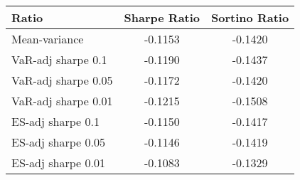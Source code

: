 \begin{tabular}{lcc}
\toprule
Ratio & Sharpe Ratio & Sortino Ratio\\
\midrule
Mean-variance & -0.1153 & -0.1420\\
VaR-adj sharpe 0.1 & -0.1190 & -0.1437\\
VaR-adj sharpe 0.05 & -0.1172 & -0.1420\\
VaR-adj sharpe 0.01 & -0.1215 & -0.1508\\
ES-adj sharpe 0.1 & -0.1150 & -0.1417\\
ES-adj sharpe 0.05 & -0.1146 & -0.1419\\
ES-adj sharpe 0.01 & -0.1083 & -0.1329\\
\bottomrule
\end{tabular}
